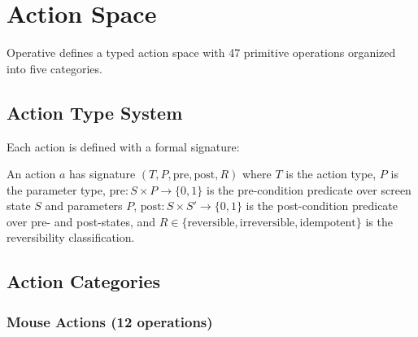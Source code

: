 \section{Action Space}

\label{sec:actions}

Operative defines a typed action space with 47 primitive operations organized into five categories.

\subsection{Action Type System}

Each action is defined with a formal signature:

\begin{definition}
An action $a$ has signature $(T, P, \text{pre}, \text{post}, R)$ where $T$ is the action type, $P$ is the parameter type, $\text{pre}: S \times P \rightarrow \{0,1\}$ is the pre-condition predicate over screen state $S$ and parameters $P$, $\text{post}: S \times S' \rightarrow \{0,1\}$ is the post-condition predicate over pre- and post-states, and $R \in \{\text{reversible}, \text{irreversible}, \text{idempotent}\}$ is the reversibility classification.
\end{definition}

\subsection{Action Categories}

\subsubsection{Mouse Actions (12 operations)}

